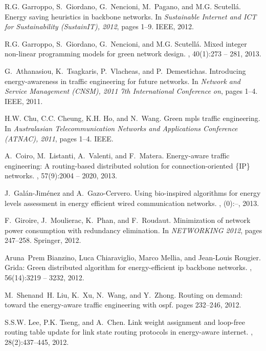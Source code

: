 \documentclass[final,5p,times,twocolumn]{elsarticle}
\begin{document}
\begin{thebibliography}{10}
R.G. Garroppo, S.~Giordano, G.~Nencioni, M.~Pagano, and M.G. Scutell\'a.
\newblock Energy saving heuristics in backbone networks.
\newblock In {\em Sustainable Internet and ICT for Sustainability (SustainIT),
  2012}, pages 1--9. IEEE, 2012.

R.G. Garroppo, S.~Giordano, G.~Nencioni, and M.G. Scutell\'a.
\newblock Mixed integer non-linear programming models for green network design.
, 40(1):273 -- 281, 2013.

G.~Athanasiou, K.~Tsagkaris, P.~Vlacheas, and P.~Demestichas.
\newblock Introducing energy-awareness in traffic engineering for future
  networks.
\newblock In {\em Network and Service Management (CNSM), 2011 7th International
  Conference on}, pages 1--4. IEEE, 2011.

H.W. Chu, C.C. Cheung, K.H. Ho, and N.~Wang.
\newblock Green mpls traffic engineering.
\newblock In {\em Australasian Telecommunication Networks and Applications
  Conference (ATNAC), 2011}, pages 1--4. IEEE.

A.~Coiro, M.~Listanti, A.~Valenti, and F.~Matera.
\newblock Energy-aware traffic engineering: A routing-based distributed
  solution for connection-oriented \{IP\} networks.
, 57(9):2004 -- 2020, 2013.

J.~Gal\'an-Jim\'enez and A.~Gazo-Cervero.
\newblock Using bio-inspired algorithms for energy levels assessment in energy
  efficient wired communication networks.
, (0):--, 2013.

F.~Giroire, J.~Moulierac, K.~Phan, and F.~Roudaut.
\newblock Minimization of network power consumption with redundancy
  elimination.
\newblock In {\em NETWORKING 2012}, pages 247--258. Springer, 2012.

Aruna~Prem Bianzino, Luca Chiaraviglio, Marco Mellia, and Jean-Louis Rougier.
\newblock Grida: Green distributed algorithm for energy-efficient ip backbone
  networks.
, 56(14):3219 -- 3232, 2012.

M.~Shenand~H. Liu, K.~Xu, N.~Wang, and Y.~Zhong.
\newblock Routing on demand: toward the energy-aware traffic engineering with
  ospf.
\newblock pages 232--246, 2012.

S.S.W. Lee, P.K. Tseng, and A.~Chen.
\newblock Link weight assignment and loop-free routing table update for link
  state routing protocols in energy-aware internet.
, 28(2):437--445, 2012.


\end{thebibliography}
\end{document}
